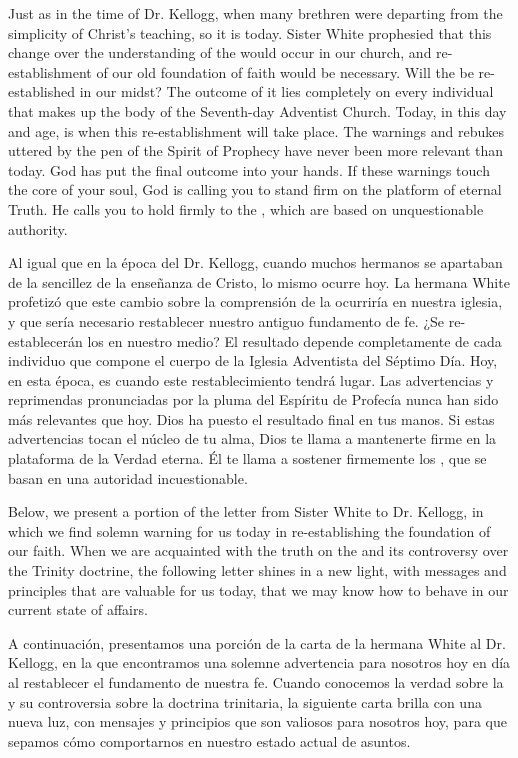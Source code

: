 Just as in the time of Dr. Kellogg, when many brethren were departing from the simplicity of Christ’s teaching, so it is today. Sister White prophesied that this change over the understanding of the  would occur in our church, and re-establishment of our old foundation of faith would be necessary. Will the  be re-established in our midst? The outcome of it lies completely on every individual that makes up the body of the Seventh-day Adventist Church. Today, in this day and age, is when this re-establishment will take place. The warnings and rebukes uttered by the pen of the Spirit of Prophecy have never been more relevant than today. God has put the final outcome into your hands. If these warnings touch the core of your soul, God is calling you to stand firm on the platform of eternal Truth. He calls you to hold firmly to the , which are based on unquestionable authority.


Al igual que en la época del Dr. Kellogg, cuando muchos hermanos se apartaban de la sencillez de la enseñanza de Cristo, lo mismo ocurre hoy. La hermana White profetizó que este cambio sobre la comprensión de la  ocurriría en nuestra iglesia, y que sería necesario restablecer nuestro antiguo fundamento de fe. ¿Se re-establecerán los  en nuestro medio? El resultado depende completamente de cada individuo que compone el cuerpo de la Iglesia Adventista del Séptimo Día. Hoy, en esta época, es cuando este restablecimiento tendrá lugar. Las advertencias y reprimendas pronunciadas por la pluma del Espíritu de Profecía nunca han sido más relevantes que hoy. Dios ha puesto el resultado final en tus manos. Si estas advertencias tocan el núcleo de tu alma, Dios te llama a mantenerte firme en la plataforma de la Verdad eterna. Él te llama a sostener firmemente los , que se basan en una autoridad incuestionable.


Below, we present a portion of the letter from Sister White to Dr. Kellogg, in which we find solemn warning for us today in re-establishing the foundation of our faith. When we are acquainted with the truth on the  and its controversy over the Trinity doctrine, the following letter shines in a new light, with messages and principles that are valuable for us today, that we may know how to behave in our current state of affairs.


A continuación, presentamos una porción de la carta de la hermana White al Dr. Kellogg, en la que encontramos una solemne advertencia para nosotros hoy en día al restablecer el fundamento de nuestra fe. Cuando conocemos la verdad sobre la  y su controversia sobre la doctrina trinitaria, la siguiente carta brilla con una nueva luz, con mensajes y principios que son valiosos para nosotros hoy, para que sepamos cómo comportarnos en nuestro estado actual de asuntos.


